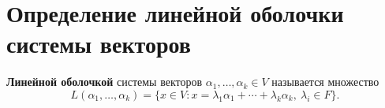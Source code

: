 \section{Определение линейной оболочки системы векторов}

\begin{definition}
\textbf{Линейной оболочкой} системы векторов $\alpha_1, \ldots, \alpha_k \in V$ называется множество
\[
L(\alpha_1, \ldots, \alpha_k) = \{ x \in V : x = \lambda_1 \alpha_1 + \cdots + \lambda_k \alpha_k,\ \lambda_i \in F \}.
\]
\end{definition}
